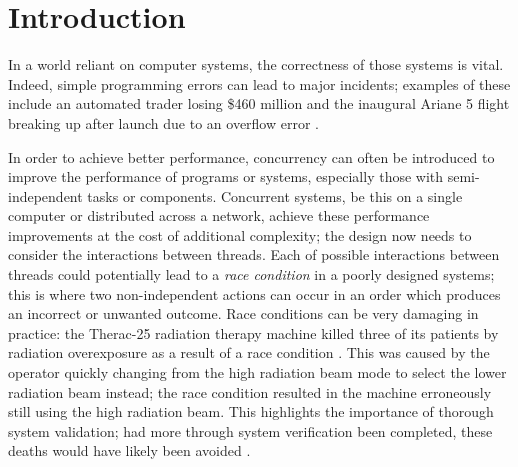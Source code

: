 \section{Introduction}


In a world reliant on computer systems, the correctness of those systems is vital. Indeed, simple programming errors can lead to major incidents; examples of these include an automated trader losing \$460 million \cite{KnightCapital} and the inaugural Ariane 5 flight breaking up after launch due to an overflow error \cite{Flight501Failure}. 

In order to achieve better performance, concurrency can often be introduced to improve the performance of programs or systems, especially those with semi-independent tasks or components.
Concurrent systems, be this on a single computer or distributed across a network, achieve these performance improvements at the cost of additional complexity; the design now needs to consider the interactions between threads. 
Each of possible interactions between threads could potentially lead to a \emph{race condition} in a poorly designed systems; this is where two non-independent actions can occur in an order which produces an incorrect or unwanted outcome. 
Race conditions can be very damaging in practice: the Therac-25 radiation therapy machine killed three of its patients by radiation overexposure as a result of a race condition \cite{BugSnag}. This was caused by the operator quickly changing from the high radiation beam mode to select the lower radiation beam instead; the race condition resulted in the machine erroneously still using the high radiation beam. This highlights the importance of thorough system validation; had more through system verification been completed, these deaths would have likely been avoided \cite{AGift}.



